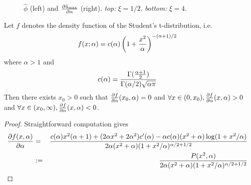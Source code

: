 \begin{subappendices}
\begin{figure}[htb!]
\begin{minipage}{0.5\linewidth}
  \end{minipage}
  \caption{$\hat\phi$ (left) and ${\partial \tilde u_{\rm max} \over \partial
      \alpha}$ (right). {\em top:} $\xi = 1/2$. {\em bottom:} $\xi =
    4$.
  }
  \label{fig:htfg}
\end{figure}
\begin{lemma}
  \label{lemma:II}
  Let $f$ denotes the density function of the Student's
  t-distribution, i.e.
  \[
  f(x; \alpha) = c(\alpha) \left(
    1 + {x^2 \over \alpha}
  \right)^{-(\alpha + 1)/2}
  \]
  where $\alpha > 1$ and
  \[
  c(\alpha) = {
    \Gamma({\alpha + 1 \over 2})
    \over
    \Gamma(\alpha/2) \sqrt{\alpha \pi}
  }
  \]
  Then there exists $x_0 > 0$ such that ${\partial f \over
    \partial \alpha}(x_0, \alpha) = 0$ and $\forall x \in (0, x_0), {\partial f \over
    \partial \alpha}(x, \alpha) > 0$ and $\forall x \in (x_0, \infty), {\partial f
    \over \partial \alpha}(x, \alpha) < 0$.
\end{lemma}
\begin{proof}
  Straightforward computation gives
  \begin{eqnarray}
    {\partial f(x, \alpha) \over \partial\alpha} &=& {
      c(\alpha) x^2 (\alpha + 1) + (2 \alpha x^2 + 2 \alpha^2) c'(\alpha)
      -
      \alpha c(\alpha) (x^2 + \alpha) \log(1 + x^2/\alpha)
      \over
      2 \alpha (x^2 + \alpha) (1 + x^2 / \alpha)^{\alpha/2 + 1/2}
    } \nonumber \\
    &:=& {
      P(x^2, \alpha)
      \over
      2 \alpha (x^2 + \alpha) (1 + x^2 / \alpha)^{\alpha/2 + 1/2}
    }
    \label{eq:xxie4.1}
  \end{eqnarray}


\end{proof}
\end{subappendices}
